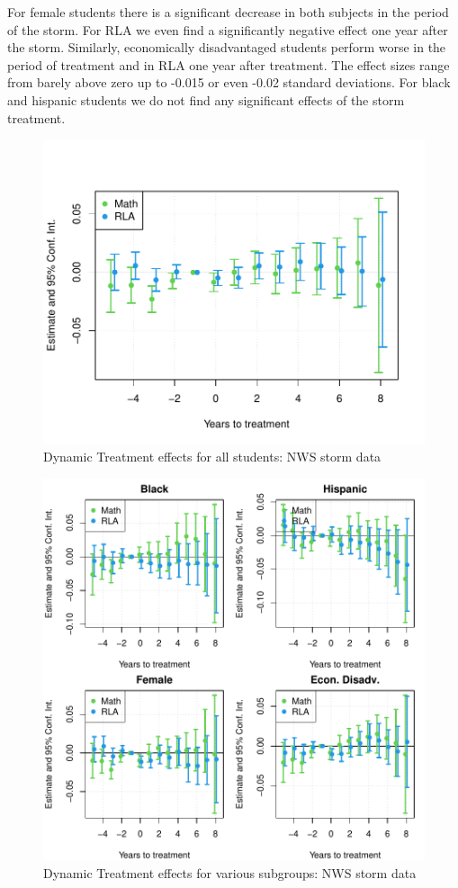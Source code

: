 For female students there is a significant decrease in both subjects in the period of the storm. For RLA we even find a significantly negative effect one year after the storm. Similarly, economically disadvantaged students perform worse in the period of treatment and in RLA one year after treatment. The effect sizes range from barely above zero up to -0.015 or even -0.02 standard deviations. For black and hispanic students we do not find any significant effects of the storm treatment.

\begin{figure}[!h]
	\centering
	\includegraphics[scale=1]{"../Code & Data/ResultsPlotStorm.pdf"}
	\caption{Dynamic Treatment effects for all students: NWS storm data}
	\label{ResultsPlotStorm}
\end{figure}

\begin{figure}[!h]
	\centering
	\includegraphics[scale=1]{"../Code & Data/ResultsPlotSubStorm.pdf"}
	\caption{Dynamic Treatment effects for various subgroups: NWS storm data}
	\label{ResultsPlotSubStorm}
\end{figure}








